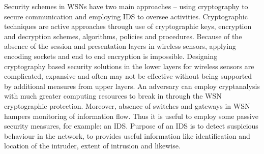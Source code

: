 \documentclass[conference,final]{IEEEtran}
\newcommand{\notedme}[1]{\raisebox{0pt}[0pt][0pt]{\pdfcomment[open=true,color=blue]{#1}}}
\begin{document}
Security schemes in WSNs have two main approaches -- using cryptography to secure communication and  employing IDS to oversee activities.
Cryptographic techniques are active approaches through use of cryptographic keys, encryption and decryption schemes, algorithms, policies and procedures.
Because  of the absence of the session and presentation layers in wireless sensors, applying encoding sockets and end to end encryption is impossible.
Designing cryptography based security solutions in the lower layers for wireless sensors are complicated, expansive and often may not be effective without being supported by additional measures from upper layers.
An adversary can employ cryptanalysis with much greater computing resources to break in through the WSN cryptographic protection.
Moreover, absence of switches and gateways in WSN hampers monitoring of information flow.
Thus it is useful to employ some passive security measures, for example: an IDS.
Purpose of an IDS is to detect suspicious behaviour in the network, to provides useful information like identification and location of the intruder, extent of intrusion and likewise.
\end{document}
